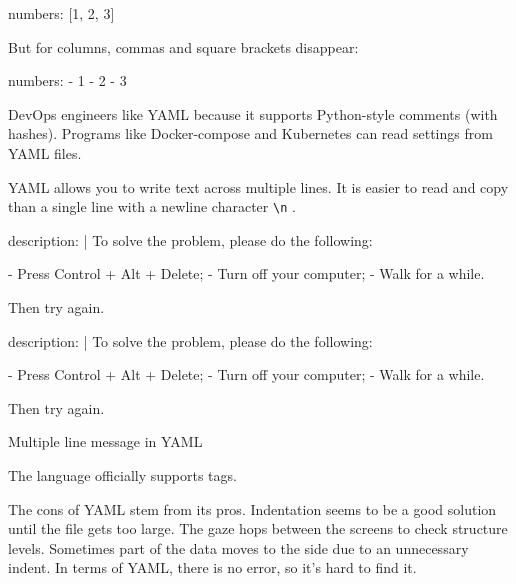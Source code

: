 
\begin{yaml}
numbers: [1, 2, 3]
\end{yaml}

\noindent
But for columns, commas and square brackets disappear:

\begin{yaml}
numbers:
  - 1
  - 2
  - 3
\end{yaml}

DevOps engineers like YAML because it supports Python-style comments (with hashes). Programs like Docker-compose and Kubernetes can read settings from YAML files.

YAML allows you to write text across multiple lines. It is easier to read and copy than a single line with a newline character \verb|\n| .

\begin{listing}[ht!]

\ifnarrow

\begin{yaml}
description: |
  To solve the problem,
  please do the following:

  - Press Control + Alt + Delete;
  - Turn off your computer;
  - Walk for a while.

  Then try again.
\end{yaml}

\else

\begin{yaml}
description: |
  To solve the problem, please do the following:

  - Press Control + Alt + Delete;
  - Turn off your computer;
  - Walk for a while.

  Then try again.
\end{yaml}

\fi

\caption{ Multiple line message in YAML}
\label{fig:yaml-multi-line}

\end{listing}

The language officially supports tags.


The cons of YAML stem from its pros. Indentation seems to be a good solution until the file gets too large. The gaze hops between the screens to check structure levels. Sometimes part of the data moves to the side due to an unnecessary indent. In terms of YAML, there is no error, so it's hard to find it.


